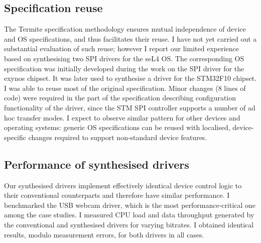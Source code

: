 \subsection{Specification reuse}  
The Termite specification methodology ensures mutual independence of device and OS specifications, and thus facilitates their reuse.  I have not yet carried out a substantial evaluation of such reuse; however I report our limited experience based on synthesising two SPI drivers for the seL4 OS\@.  The corresponding OS specification was initially developed during the work on the SPI driver for the exynos chipset.  It was later used to synthesise a driver for the STM32F10 chipset.  I was able to reuse most of the original specification.  Minor changes (8 lines of code) were required in the part of the specification describing configuration functionality of the driver, since the STM SPI controller supports a number of ad hoc transfer modes.  I expect to observe similar pattern for other devices and operating systems: generic OS specifications can be reused with localised, device-specific changes required to support non-standard device features.

\subsection{Performance of synthesised drivers} 
Our synthesised drivers implement effectively identical device control logic to their conventional counterparts and therefore have similar performance.  I benchmarked the USB webcam driver, which is the most performance-critical one among the case studies.  I measured CPU load and data throughput generated by the conventional and synthesised drivers for varying bitrates.  I obtained identical results, modulo measurement errors, for both drivers in all cases.

